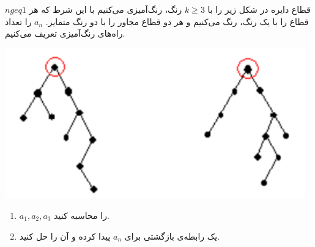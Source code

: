 \EXERCISE
$n geq 1$
قطاع دایره در شکل زیر را با
$k \geq 3$
رنگ، رنگ‌آمیزی می‌کنیم با این شرط که هر قطاع را با یک رنگ، رنگ می‌کنیم و هر دو قطاع مجاور را با دو رنگ متمایز.
$a_n$
را تعداد راه‌های رنگ‌آمیزی تعریف می‌کنیم.
\begin{center}
\includegraphics[height=6.5cm]{19.png}
\end{center}
\begin{enumerate}
\item
$a_1, a_2, a_3$
را محاسبه کنید.
\item
یک رابطه‌ی بازگشتی برای
$a_n$
پیدا کرده و آن را حل کنید.
\end{enumerate}